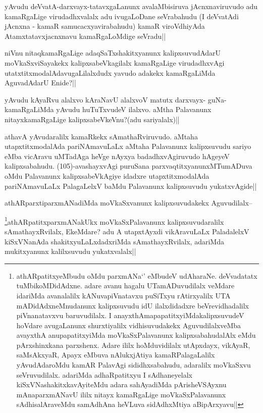 
\begin{artha}
yAvudu deVvatA-darxvayx-tatavxgaLanunx avalaMbisiruva jAcnxnaviruvudo adu kamaRgaLige virudadhxvalalx adu ivugaLoDane seVrabahudu (I deVvatAdi jAcnxna - kamaR samucacxyavirabahudu) kamaR viroVdhiyAda Atamxtatavxjacnxnavu kamaRgaLoMdige seVradu||
\end{artha}

\begin{artha}
niVnu nitaqkamaRgaLige adaqSaTxshakitxyanunx kalipxsuvudAdarU moVkaSxviSayakekx kalipxsabeVkagilalx kamaRgaLige virudadhxvAgi utatxtitxmodalAdavugaLilalxdudx yavudo adakekx kamaRgaLiMda AguvadAdarU Enide?||
\end{artha}

\begin{artha}
yAvudu kAyaRvu alalxvo kAraNavU alalxvoV matutx darxvayx- guNa-kamaRgaLiMda yAvudu huTuTxvudeV ilalxvo. aMtha Palavanunx nitayxkamaRgaLige kalipxsabeVkeVnu?(adu sariyalalx)||
\end{artha}

\begin{artha}
athavA yAvudaralilx kamaRkekx sAmathaRviruvudo. aMtaha utapxtitxmodalAda pariNAmavuLaLx aMtaha Palavanunx kalipxsuvudu sariyo eMba vicAravu uMTadAga heVge nAyxya badadhxvAgiruvudo hAgeyeV kalipxsabahudu. (105)-avashayxvAgi puruSana parxvaqtitxyanunxMTumADuva oMdu Palavanunx kalipxsabeVkAgiye idadxre utapxtitxmodalAda pariNAmavuLaLx PalagaLelxV baMdu Palavanunx kalipxsuvudu yukatxvAgide||
\end{artha}

\begin{artha}
athARparxtiparxmANadiMda moVkaSxvanunx kalipxsuvudakekx Aguvudilalx--
\end{artha}

\begin{artha}
\footnote{athARpatitxyeMbudu oMdu parxmANa`\stext' eMbudeV udAharaNe. deVvadatatx tuMbikoMDidAdxne. adare avanu hagalu UTamADuvudilalx veMdare idariMda avanalalilx kANuvapiVnatavxu puSiTxyu rAtirxyalilx UTA mADidAdxneMnudanunx kalipxsuvudu idU ilalxdidadxre beVrevidhadalilx piVnanatavxvu baruvudilalx. I anayxthAmapapatitxyiMdakalipxsuvudeV hoVdare avugaLanunx shurxtiyalilx vidhisuvudakekx AguvudilalxveMba avayxthA anupapatitxyiMda moVkaSxPalavanunx kalipxsabahudalAlx eMdu pArxshinxkana parxshenx. Adare ililx hoMduvidilalx utApxdayx, vikAyaR, saMsAkxyaR, Apayx eMbuva nAlukxjAtiya kamaRPalagaLalilx yAvudAdaroMdu kamAR PalavAgi sididhxsabahudu, adaralilx moVkaSxvu seVruvudilalx. adariMda adhaRpatitxyu I sAdhaneyelalx kiSxVNashakitxkavAyiteMdu adara sahAyadiMda pArisheVSAyxnu mAnaparxmANavU ililx nitayx kamaRgaLige moVkaSxPalavanunx sAdhisalAraveMdu samAdhAna heVLuva sidAdhxMtiya aBipArxyavu||}athARpatitxparxmANakUkx moVkaSxPalavanunx kalipxsuvudaralilx sAmathayxRvilalx, EkeMdare? adu A utapxtAyxdi vikAravuLaLx PaladalelxV kiSxVNanAda shakitxyuLaLxdadxriMda sAmathayxRvilalx, adariMda mukitxyanunx kalilxsuvudu yukatxvalalx||
\end{artha}

